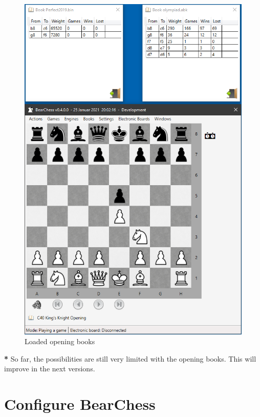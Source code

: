 \documentclass[11pt,a4paper]{article}
\begin{document}
\begin{figure}[H]
	\centering
	\includegraphics[scale=0.8]{OpeningBook2.png}
	\caption{Loaded opening books }
	\label{fig:OpeningBook2}
\end{figure}

{\color{red}\textbf{*}} So far, the possibilities are still very limited with the opening books. This will improve in the next versions. 

\section{Configure BearChess} \label{ConfigureBearChess}
\end{document}
